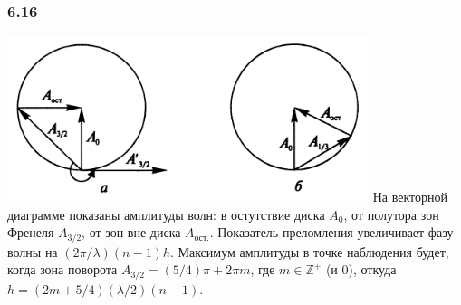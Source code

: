\subsubsection*{6.16}
\includegraphics{parts/img/6_16.png}
На векторной диаграмме показаны амплитуды волн: в остутствие диска $A_0$, от полутора зон Френеля $A_{3/2}$, от зон вне диска $A_{ост.}$. Показатель преломления увеличивает фазу волны на $(2\pi / \lambda)(n - 1)h$. Максимум амплитуды в точке наблюдения будет, когда зона поворота $A_{3/2} = (5/4)\pi + 2\pi m $, где $m \in \mathbb{Z}^+$ (и $0$), откуда $h = (2m + 5/4)(\lambda/2)(n-1)$.